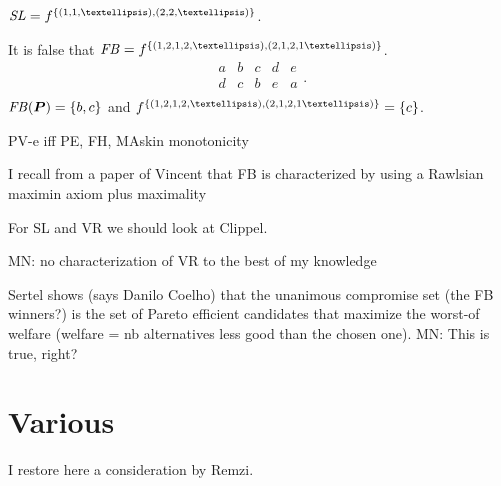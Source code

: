 \documentclass[version=3.21, pagesize, twoside=off, bibliography=totoc, DIV=calc, fontsize=12pt, a4paper]{scrartcl}
\begin{document}
\begin{conjecture}
	\label{th:slVce}
	$\SL = f^{\set{(1, 1, …), (2, 2, …)}}$.
\end{conjecture}

\begin{remark}
	\label{th:fbVce}
	It is false that
	$\FB = f^{\set{(1, 2,1,2, …), (2, 1,2,1 …)}}$.
    \begin{equation}
        \begin{array}{lllll}
                a&b&c&d&e\\
                d&c&b&e&a\\
        \end{array}.
    \end{equation}
    $\mathit{FB}(\bm{P}) = \{b, c\}$ and $f^{\set{(1, 2,1,2, …), (2, 1,2,1 …)}}=\{c\}$.
\end{remark}


PV-e iff PE, FH, MAskin monotonicity

I recall from a paper of Vincent that FB is characterized by using a Rawlsian maximin axiom plus maximality 

For SL and VR we should look at Clippel. 

\color{green} MN: no characterization of VR to the best of my knowledge \color{black}

Sertel shows (says Danilo Coelho) that the unanimous compromise set (the FB winners?) is the set of Pareto efficient candidates that maximize the worst-of welfare (welfare = nb alternatives less good than the chosen one). \color{green} MN: This is true, right? \color{black}


\section{Various}
I restore here a consideration by Remzi.
\end{document}
